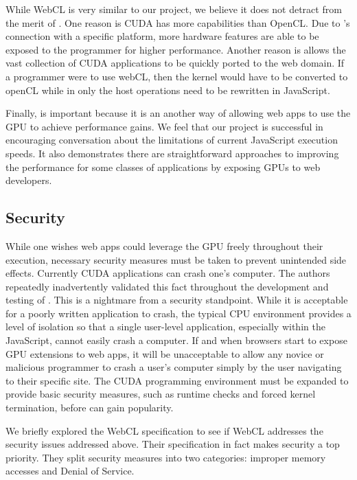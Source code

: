 While WebCL is very similar to our project, we believe it does not detract from
the merit of \namens. One reason is CUDA has more capabilities than OpenCL. Due
to \namens's connection with a specific platform, more hardware features are
able to be exposed to the programmer for higher performance. Another reason is
\name allows the vast collection of CUDA applications to be quickly ported to
the web domain. If a programmer were to use webCL, then the kernel would have to
be converted to openCL while in \name only the host operations need to be
rewritten in JavaScript.

Finally, \name is important because it is an another way of allowing web apps
to use the GPU to achieve performance gains. We feel that our project is
successful in encouraging conversation about the limitations of current JavaScript
execution speeds. It also demonstrates there are straightforward approaches to
improving the performance for some classes of applications by exposing GPUs to
web developers.



\subsection{Security} \label{security} While one wishes web apps could leverage
the GPU freely throughout their execution, necessary security measures must be
taken to prevent unintended side effects. Currently CUDA applications can crash
one's computer.  The authors repeatedly inadvertently validated this fact
throughout the development and testing of \namens. This is a nightmare from a
security standpoint. While it is acceptable for a poorly written application to
crash, the typical CPU environment provides a level of isolation so that a
single user-level application, especially within the JavaScript, cannot easily
crash a computer. If and when browsers start to expose GPU extensions to web
apps, it will be unacceptable to allow any novice or malicious programmer to
crash a user's computer simply by the user navigating to their specific site.
The CUDA programming environment must be expanded to provide basic security
measures, such as runtime checks and forced kernel termination, before \name
can gain popularity.

We briefly explored the WebCL specification to see if WebCL addresses the
security issues addressed above. Their specification in fact makes security a
top priority. They split security measures into two categories: improper memory
accesses and Denial of Service.

